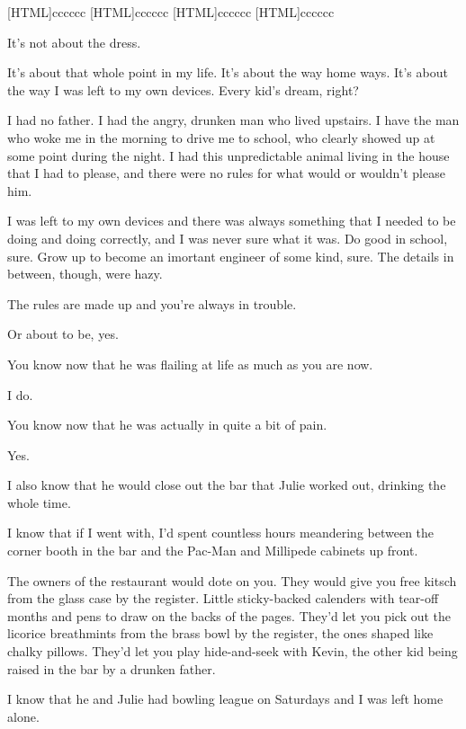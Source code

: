 \label{dad}
[HTML]{cccccc}
[HTML]{cccccc}
[HTML]{cccccc}
[HTML]{cccccc}
\begin{paracol}{2}
\begin{leftcolumn}

\end{leftcolumn}
\end{paracol}

\begin{paracol}{2}
\begin{leftcolumn}
\noindent It's not about the dress.

It's about that whole point in my life. It's about the way home ways. It's about the way I was left to my own devices. Every kid's dream, right?

I had no father. I had the angry, drunken man who lived upstairs. I have the man who woke me in the morning to drive me to school, who clearly showed up at some point during the night. I had this unpredictable animal living in the house that I had to please, and there were no rules for what would or wouldn't please him.

I was left to my own devices and there was always something that I needed to be doing and doing correctly, and I was never sure what it was. Do good in school, sure. Grow up to become an imortant engineer of some kind, sure. The details in between, though, were hazy.

\begin{ally}
The rules are made up and you're always in trouble.
\end{ally}
Or about to be, yes.

\begin{ally}
You know now that he was flailing at life as much as you are now.
\end{ally}
I do.

\begin{ally}
You know now that he was actually in quite a bit of pain.
\end{ally}
Yes.

I also know that he would close out the bar that Julie worked out, drinking the whole time.

I know that if I went with, I'd spent countless hours meandering between the corner booth in the bar and the Pac-Man and Millipede cabinets up front.

\begin{ally}
The owners of the restaurant would dote on you. They would give you free kitsch from the glass case by the register. Little sticky-backed calenders with tear-off months and pens to draw on the backs of the pages. They'd let you pick out the licorice breathmints from the brass bowl by the register, the ones shaped like chalky pillows. They'd let you play hide-and-seek with Kevin, the other kid being raised in the bar by a drunken father.
\end{ally}
I know that he and Julie had bowling league on Saturdays and I was left home alone.


\end{leftcolumn}
\end{paracol}
